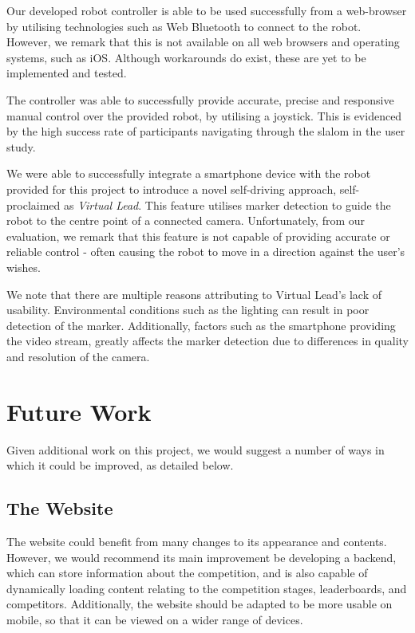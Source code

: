 \documentclass{l4proj}
\begin{document}
Our developed robot controller is able to be used successfully from a web-browser by utilising technologies such as Web Bluetooth to connect to the robot. However, we remark that this is not available on all web browsers and operating systems, such as iOS. Although workarounds do exist, these are yet to be implemented and tested.

The controller was able to successfully provide accurate, precise and responsive manual control over the provided robot, by utilising a joystick. This is evidenced by the high success rate of participants navigating through the slalom in the user study.

We were able to successfully integrate a smartphone device with the robot provided for this project to introduce a novel self-driving approach, self-proclaimed as \textit{Virtual Lead}. This feature utilises marker detection to guide the robot to the centre point of a connected camera. Unfortunately, from our evaluation, we remark that this feature is not capable of providing accurate or reliable control - often causing the robot to move in a direction against the user's wishes.

We note that there are multiple reasons attributing to Virtual Lead's lack of usability. Environmental conditions such as the lighting can result in poor detection of the marker. Additionally, factors such as the smartphone providing the video stream, greatly affects the marker detection due to differences in quality and resolution of the camera.

\section{Future Work}
Given additional work on this project, we would suggest a number of ways in which it could be improved, as detailed below.

\subsection{The Website}
The website could benefit from many changes to its appearance and contents. However, we would recommend its main improvement be developing a backend, which can store information about the competition, and is also capable of dynamically loading content relating to the competition stages, leaderboards, and competitors. Additionally, the website should be adapted to be more usable on mobile, so that it can be viewed on a wider range of devices.
\end{document}
